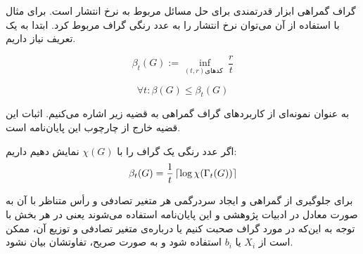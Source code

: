 	گراف گمراهی ابزار قدرتمندی برای حل مسائل مربوط به نرخ انتشار است. برای مثال با استفاده از آن می‌توان نرخ انتشار را به عدد رنگی گراف مربوط کرد. ابتدا به یک تعریف نیاز داریم.
	\begin{definition}
		\begin{equation}
			\beta_t(G) := \inf_{
				(t, r)
				\text{
					کدهای
				}
			} \dfrac{r}{t}
		\end{equation}
	\end{definition}
	\begin{remark}
		\begin{equation}
			\forall t: \beta(G) \leq \beta_t(G)
		\end{equation}
	\end{remark}
	به عنوان نمونه‌ای از کاربردهای گراف گمراهی به قضیه زیر اشاره می‌کنیم. اثبات این قضیه خارج از چارچوب این پایان‌نامه است.
	\begin{theorem}
		اگر عدد رنگی یک گراف را با
		$\chi(G)$
		نمایش دهیم داریم:
		\begin{equation}
			\beta_t(G) = \dfrac{1}{t}\left\lceil{\log \chi(\Gamma_t(G))}\right\rceil
		\end{equation}
	\end{theorem}
	\begin{remark}
	\label{remark:xbdiff}
	برای جلوگیری از گمراهی و ایجاد سردرگمی هر متغیر تصادفی و رأس متناظر با آن به صورت معادل در ادبیات پژوهشی و این پایان‌نامه استفاده می‌شوند یعنی در هر بخش با توجه به این‌که در مورد گراف صحبت کنیم یا درباره‌ی متغیر تصادفی و توزیع آن،
    ممکن است از
	$X_i$
	یا
	$b_i$
	استفاده شود و به صورت صریح، تفاوتشان بیان نشود.
\end{remark}
 
